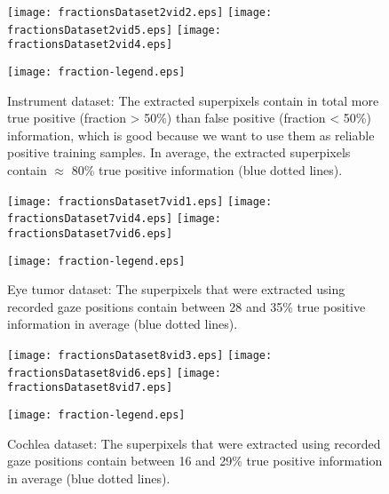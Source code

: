 \begin{figure}[ht]
	  \texttt{[image: fractionsDataset2vid2.eps]}
	  \texttt{[image: fractionsDataset2vid5.eps]}	  
	  \texttt{[image: fractionsDataset2vid4.eps]}
	  
	  \centering
	  \texttt{[image: fraction-legend.eps]}
	  \caption{Instrument dataset: The extracted superpixels contain in total more true positive (fraction > 50\%) than false positive (fraction < 50\%) information, which is good because we want to use them as reliable positive training samples. In average, the extracted superpixels contain $\approx$ 80\% true positive information (blue dotted lines).}
	\label{fig:positiveFractionD2}
\end{figure}

\begin{figure}[ht]
	  \texttt{[image: fractionsDataset7vid1.eps]}
	  \texttt{[image: fractionsDataset7vid4.eps]}
	  \texttt{[image: fractionsDataset7vid6.eps]}
	  
	  \centering
	  \texttt{[image: fraction-legend.eps]}
	  \caption{Eye tumor dataset: The superpixels that were extracted using recorded gaze positions contain between 28 and 35\% true positive information in average (blue dotted lines).}
	\label{fig:positiveFractionD7}
\end{figure}

\begin{figure}[ht]
	  \texttt{[image: fractionsDataset8vid3.eps]}
	  \texttt{[image: fractionsDataset8vid6.eps]}
	  \texttt{[image: fractionsDataset8vid7.eps]}
	  
	  \centering
	  \texttt{[image: fraction-legend.eps]}
	  \caption{Cochlea dataset: The superpixels that were extracted using recorded gaze positions contain between 16 and 29\% true positive information in average (blue dotted lines).}
	\label{fig:positiveFractionD8}
\end{figure}

